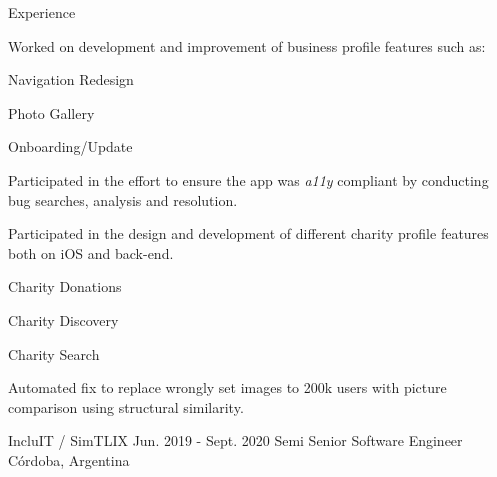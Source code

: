 \documentclass{curriculum}
\begin{document}
\begin{cvsection}{Experience}
\begin{sectionitemlist}
        \item{
            Worked on development and improvement of business profile features such as:
        }{
            \begin{colsectionitemlist}{2}
            \item{Navigation Redesign}
            \item{Photo Gallery}
            \item{Onboarding/Update}
            \end{colsectionitemlist}
        }

        \item{
            Participated in the effort to ensure the app was \textit{a11y} compliant
            by conducting bug searches, analysis and resolution.
        }

        \item{
            Participated in the design and development of
            different charity profile features both on iOS and back-end.
        }{
            \begin{colsectionitemlist}{3}
            \item{Charity Donations}
            \item{Charity Discovery}
            \item{Charity Search}
            \end{colsectionitemlist}
        }

        \item{
            Automated fix to replace wrongly set images to 200k users with
            picture comparison using structural similarity.
        }

        \end{sectionitemlist}


    \makesectionitemheader
        {IncluIT / SimTLIX}                             {Jun. 2019 - Sept. 2020}
        {Semi Senior Software Engineer}                                {Córdoba, Argentina}

        \begin{sectionitemlist}


\end{sectionitemlist}
\end{cvsection}
\end{document}
